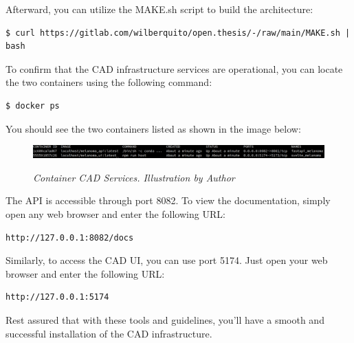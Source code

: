 Afterward, you can utilize the MAKE.sh script to build the architecture:

\begin{Verbatim}[fontsize=\small]
$ curl https://gitlab.com/wilberquito/open.thesis/-/raw/main/MAKE.sh | bash
\end{Verbatim}

To confirm that the CAD infrastructure services are operational,
you can locate the two containers using the following command:

\begin{Verbatim}[fontsize=\small]
$ docker ps
\end{Verbatim}

You should see the two containers listed as shown in the image below:

\begin{figure}[H]
\centering
\includegraphics[width=\textwidth]{imatges/appendices/services.png}
\caption[Container CAD Services]{\textit{Container CAD Services. Illustration by Author}}
{\label{fig:polling-layer}}
\end{figure}

The API is accessible through port 8082. To view the documentation, simply open any web browser and enter the following URL:

\begin{Verbatim}[fontsize=\small]
http://127.0.0.1:8082/docs
\end{Verbatim}

Similarly, to access the CAD UI, you can use port 5174. Just open your web browser and enter the following URL:

\begin{Verbatim}[fontsize=\small]
http://127.0.0.1:5174
\end{Verbatim}

Rest assured that with these tools and guidelines,
you'll have a smooth and successful installation of the CAD infrastructure.
